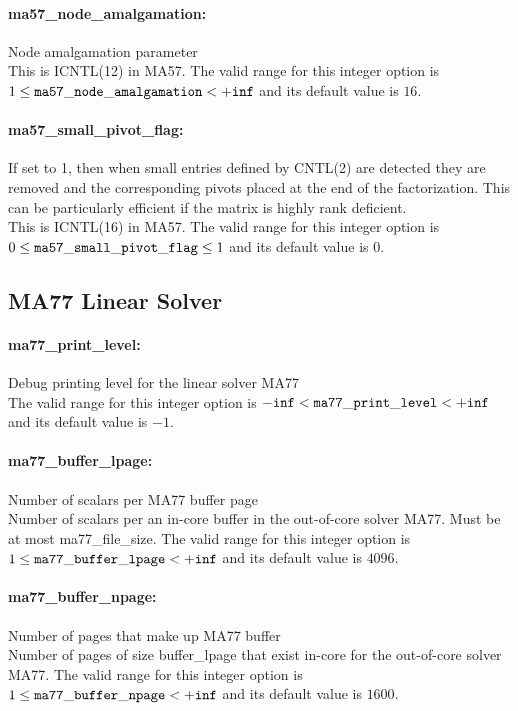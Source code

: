 \paragraph{ma57\_node\_amalgamation:}\label{opt:ma57_node_amalgamation} Node amalgamation parameter \\
 This is ICNTL(12) in MA57. The valid range for this integer option is
$1 \le {\tt ma57\_node\_amalgamation } <  {\tt +inf}$
and its default value is $16$.


\paragraph{ma57\_small\_pivot\_flag:}\label{opt:ma57_small_pivot_flag} If set to 1, then when small entries defined by CNTL(2) are detected they are removed and the corresponding pivots placed at the end of the factorization.  This can be particularly efficient if the matrix is highly rank deficient. \\
 This is ICNTL(16) in MA57. The valid range for this integer option is
$0 \le {\tt ma57\_small\_pivot\_flag } \le 1$
and its default value is $0$.


\subsection{MA77 Linear Solver}

\paragraph{ma77\_print\_level:}\label{opt:ma77_print_level} Debug printing level for the linear solver MA77 \\
 The valid range for this integer option is
${\tt -inf} <  {\tt ma77\_print\_level } <  {\tt +inf}$
and its default value is $-1$.


\paragraph{ma77\_buffer\_lpage:}\label{opt:ma77_buffer_lpage} Number of scalars per MA77 buffer page \\
 Number of scalars per an in-core buffer in the out-of-core solver MA77. Must be at most ma77\_file\_size. The valid range for this integer option is
$1 \le {\tt ma77\_buffer\_lpage } <  {\tt +inf}$
and its default value is $4096$.


\paragraph{ma77\_buffer\_npage:}\label{opt:ma77_buffer_npage} Number of pages that make up MA77 buffer \\
 Number of pages of size buffer\_lpage that exist in-core for the out-of-core solver MA77. The valid range for this integer option is
$1 \le {\tt ma77\_buffer\_npage } <  {\tt +inf}$
and its default value is $1600$.


